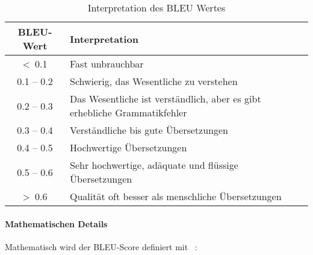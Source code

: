 \begin{table}[ht]
	\begin{tabular}{| c | l |}
	\hline
	BLEU-Wert            & Interpretation                                                            \\ \hline
	\textless \ 0.1      & Fast unbrauchbar                                                          \\
	0.1 – 0.2            & Schwierig, das Wesentliche zu verstehen                                   \\
	0.2 – 0.3            & Das Wesentliche ist verständlich, aber es gibt erhebliche Grammatikfehler \\
	0.3 – 0.4            & Verständliche bis gute Übersetzungen                                      \\
	0.4 – 0.5            & Hochwertige Übersetzungen                                                 \\
	0.5 – 0.6            & Sehr hochwertige, adäquate und flüssige Übersetzungen                     \\
	\textgreater \ 0.6   & Qualität oft besser als menschliche Übersetzungen 					     \\
	\hline                        
	\end{tabular}
	\caption{Interpretation des BLEU Wertes}
	\label{tab:BLEU-Interpretation}
\end{table}

\paragraph{Mathematischen Details}
Mathematisch wird der BLEU-Score definiert mit ~\autocite{modelle_bewerten_bleu}:

